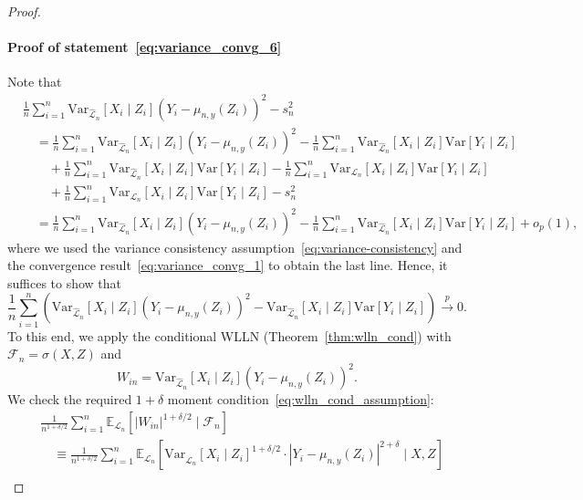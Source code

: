 \documentclass[aos]{imsart}
\theoremstyle{plain}
\theoremstyle{remark}
\newcommand{\E}{\mathbb E}								%
\newcommand{\V}{\mathrm{Var}}							%
\newcommand{\convp}{\overset p \rightarrow}             %
\newcommand{\srx}{X}									%
\newcommand{\srz}{Z}									%
\newcommand{\sry}{Y}									%
\newcommand{\law}{\mathcal L}							%
\newcommand{\lawhat}{\widehat{\mathcal L}}				%
\begin{document}
\begin{proof}
	\paragraph*{Proof of statement~\eqref{eq:variance_convg_6}}
	
	Note that
	\begin{equation*}
		\begin{split}
			&\frac{1}{n}\sum_{i = 1}^n \V_{\lawhat_n}[\srx_i\mid\srz_i](\sry_i - \mu_{n,y}(\srz_i))^2-s^2_n \\
			&\quad= \frac{1}{n}\sum_{i = 1}^n \V_{\lawhat_n}[\srx_i\mid\srz_i](\sry_i - \mu_{n,y}(\srz_i))^2 - \frac{1}{n}\sum_{i = 1}^n \V_{\lawhat_n}[\srx_i\mid\srz_i]\V[\sry_i \mid \srz_i]  \\
			&\quad \quad + \frac{1}{n}\sum_{i = 1}^n \V_{\lawhat_n}[\srx_i\mid\srz_i]\V[\sry_i \mid \srz_i] - \frac{1}{n}\sum_{i = 1}^n \V_{\law_n}[\srx_i\mid\srz_i]\V[\sry_i \mid \srz_i] \\
			&\quad \quad + \frac{1}{n}\sum_{i = 1}^n \V_{\law_n}[\srx_i\mid\srz_i]\V[\sry_i \mid \srz_i] - s^2_n \\
			&\quad = \frac{1}{n}\sum_{i = 1}^n \V_{\lawhat_n}[\srx_i\mid\srz_i](\sry_i - \mu_{n,y}(\srz_i))^2 - \frac{1}{n}\sum_{i = 1}^n \V_{\lawhat_n}[\srx_i\mid\srz_i]\V[\sry_i \mid \srz_i] + o_p(1),
		\end{split}
	\end{equation*}
	where we used the variance consistency assumption~\eqref{eq:variance-consistency} and the convergence result~\eqref{eq:variance_convg_1} to obtain the last line. Hence, it suffices to show that
	\begin{equation}
		\frac{1}{n}\sum_{i = 1}^n \left(\V_{\lawhat_n}[\srx_i\mid\srz_i](\sry_i - \mu_{n,y}(\srz_i))^2 - \V_{\lawhat_n}[\srx_i\mid\srz_i]\V[\sry_i \mid \srz_i]\right) \convp 0.
		\label{eq:sufficient-convergence-2}
	\end{equation}
	To this end, we apply the conditional WLLN (Theorem~\ref{thm:wlln_cond}) with $\mathcal{F}_n = \sigma(X,Z)$ and
	\begin{equation*}
		W_{in} = \V_{\lawhat_n}[\srx_i\mid \srz_i](\sry_i-\mu_{n,y}(\srz_i))^2.
	\end{equation*}
	We check the required $1+\delta$ moment condition~\eqref{eq:wlln_cond_assumption}:
	\begin{align*}
		&\frac{1}{n^{1+\delta/2}} \sum_{i = 1}^n \E_{\law_n}[|W_{in}|^{1+\delta/2} \mid \mathcal{F}_n] \\
		&\quad\equiv \frac{1}{n^{1+\delta/2}} \sum_{i = 1}^n \E_{\law_n}\left[\V_{\lawhat_n}[\srx_i\mid \srz_i]^{1+\delta/2} \cdot |\sry_i-\mu_{n,y}(\srz_i)|^{2+\delta}\mid \srx,\srz\right]\\

\end{align*}
\end{proof}
\end{document}
